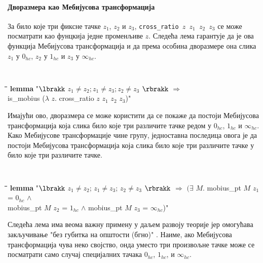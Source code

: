 \paragraph{Дворазмера као Мебијусова трансформација}
За било које три фиксне тачке $z_1$, $z_2$ и $z_3$, {\tt cross\_ratio
  $z$ $z_1$ $z_2$ $z_3$} се може посматрати као фунцкија једне
променљиве $z$. Следећа лема гарантује да је ова функција Мебијусова
трансформација и да према особина дворазмере она слика $z_1$ у
$0_{hc}$, $z_2$ у $1_{hc}$ и $z_3$ у $\infty_{hc}$.

{\tt
\begin{tabbing}
\hspace{5mm}\=\hspace{5mm}\=\hspace{5mm}\=\hspace{5mm}\=\hspace{5mm}\=\kill
{\bf lemma} "$\lbrakk$ $z_1 \neq z_2; z_1 \neq z_3; z_2 \neq z_3$ $\rbrakk$ $\Longrightarrow$ \\
\>is\_mobius ($\lambda$ $z$. cross\_ratio $z$ $z_1$ $z_2$ $z_3$)"
\end{tabbing}
}

Имајући ово, дворазмера се може користити да се покаже да постоји
Мебијусова трансформација која слика било које три различите тачке
редом у $0_{hc}$, $1_{hc}$ и $\infty_{hc}$. Како Мебијусове
трансформације чине групу, једноставна последица овога је да постоји
Мебијусова трансформација која слика било које три различите тачке у
било које три различите тачке.

{\tt
\begin{tabbing}
\hspace{5mm}\=\hspace{5mm}\=\hspace{5mm}\=\hspace{5mm}\=\hspace{5mm}\=\kill
{\bf lemma} "$\lbrakk$ $z_1 \neq z_2$; $z_1 \neq z_3$; $z_2 \neq z_3$ $\rbrakk$ $\Longrightarrow$ $(\exists$ $M$. mobius\_pt $M$ $z_1$ = $0_{hc}$ $\wedge$ \\
\> mobius\_pt $M$ $z_2$ = $1_{hc}$ $\wedge$ mobius\_pt $M$ $z_3$ = $\infty_{hc}$)"
\end{tabbing}
}

Следећа лема има веома важну примену у даљем развоју теорије јер
омогућава закључивање "без губитка на општости (бгно)"
\cite{wlog}. Наиме, ако Мебијусова трансформација чува неко својство,
онда уместо три произвољне тачке може се посматрати само случај
специјалних тачака $0_{hc}$, $1_{hc}$, и $\infty_{hc}$.

